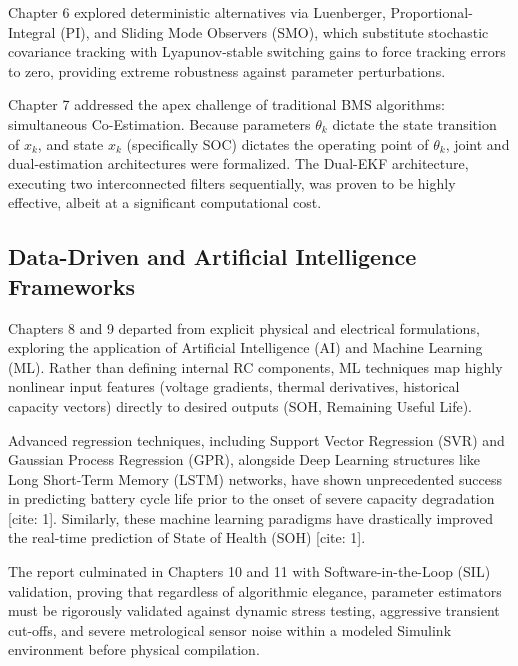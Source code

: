 Chapter 6 explored deterministic alternatives via Luenberger, Proportional-Integral (PI), and Sliding Mode Observers (SMO), which substitute stochastic covariance tracking with Lyapunov-stable switching gains to force tracking errors to zero, providing extreme robustness against parameter perturbations.

Chapter 7 addressed the apex challenge of traditional BMS algorithms: simultaneous Co-Estimation. Because parameters $\theta_k$ dictate the state transition of $x_k$, and state $x_k$ (specifically SOC) dictates the operating point of $\theta_k$, joint and dual-estimation architectures were formalized. The Dual-EKF architecture, executing two interconnected filters sequentially, was proven to be highly effective, albeit at a significant computational cost.

\subsection{Data-Driven and Artificial Intelligence Frameworks}
\label{subsec:summary_ai}

Chapters 8 and 9 departed from explicit physical and electrical formulations, exploring the application of Artificial Intelligence (AI) and Machine Learning (ML). Rather than defining internal RC components, ML techniques map highly nonlinear input features (voltage gradients, thermal derivatives, historical capacity vectors) directly to desired outputs (SOH, Remaining Useful Life). 

Advanced regression techniques, including Support Vector Regression (SVR) and Gaussian Process Regression (GPR), alongside Deep Learning structures like Long Short-Term Memory (LSTM) networks, have shown unprecedented success in predicting battery cycle life prior to the onset of severe capacity degradation \cite{severson2019data}[cite: 1]. Similarly, these machine learning paradigms have drastically improved the real-time prediction of State of Health (SOH) \cite{ng2020predicting}[cite: 1].

The report culminated in Chapters 10 and 11 with Software-in-the-Loop (SIL) validation, proving that regardless of algorithmic elegance, parameter estimators must be rigorously validated against dynamic stress testing, aggressive transient cut-offs, and severe metrological sensor noise within a modeled Simulink environment before physical compilation.

\vspace{4cm}

